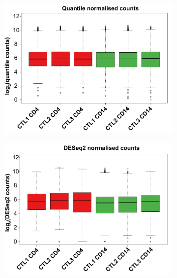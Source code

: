 \begin{figure}[ht]
\centering
\begin{subfigure}{0.45\textwidth}
\centering
\includegraphics[width=\textwidth]{./Results1/pdfs/ATAC_Core_CD4_CD14_boxplot_80pcnt_cut_off_filtered_quantile_counts}
\caption{\textbf{}}
\end{subfigure}%
\begin{subfigure}{0.45\textwidth}
\centering
\includegraphics[width=\textwidth]{./Results1/pdfs/ATAC_Core_fastq_CD4_CD14_DESeq2_mean_vs_log2sd}
\caption{\textbf{}}
\end{subfigure}
\begin{subfigure}{0.5\textwidth}
\centering

\end{subfigure}
\end{figure}
